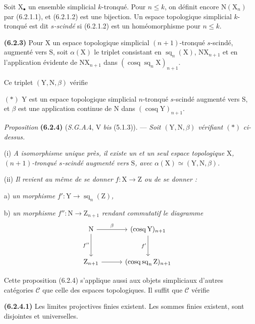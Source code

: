 \documentclass[11pt,leqno]{article}
\newcommand{\Page}[1]{\ifvmode\noindent\else\unskip\ \fi{\footnotesize\textcolor{gray}{[p.\,#1]}}\ \ignorespaces}
\begin{document}
Soit \(\mathrm{X}_{\bullet}\) un ensemble simplicial \(k\)-tronqué. Pour \(n\leq k\), on définit encore \(\mathrm{N}(\mathrm{X}_n)\) par (6.2.1.1), et (6.2.1.2) est une bijection. Un espace topologique simplicial \(k\)-tronqué est dit \textit{\(s\)-scindé} si (6.2.1.2) est un homéomorphisme pour \(n\leq k\).

\textbf{(6.2.3)} Pour \(\mathrm{X}\) un espace topologique simplicial \((n+1)\)-tronqué \(s\)-scindé, augmenté vers \(\mathrm{S}\), soit \(\alpha(\mathrm{X})\) le triplet consistant en \(\operatorname{sq}_n(\mathrm{X})\), \(\mathrm{N}\mathrm{X}_{n+1}\) et en l’application évidente de \(\mathrm{N}\mathrm{X}_{n+1}\) dans \((\operatorname{cosq}\operatorname{sq}_n\mathrm{X})_{n+1}\).

Ce triplet \((\mathrm{Y},\mathrm{N},\beta)\) vérifie

\((\ast)\) \(\mathrm{Y}\) est un espace topologique simplicial \(n\)-tronqué \(s\)-scindé augmenté vers \(\mathrm{S}\), et \(\beta\) est une application continue de \(\mathrm{N}\) dans \((\operatorname{cosq}\mathrm{Y})_{n+1}\).

\textit{Proposition} \textbf{(6.2.4)} (\textit{S.G.A.}4, V \textit{bis} (5.1.3)). — \textit{Soit \((\mathrm{Y},\mathrm{N},\beta)\) vérifiant \((\ast)\) ci-dessus.}

(i) \textit{A isomorphisme unique près, il existe un et un seul espace topologique \(\mathrm{X}\), \((n+1)\)-tronqué \(s\)-scindé augmenté vers \(\mathrm{S}\), avec \(\alpha(\mathrm{X})\simeq(\mathrm{Y},\mathrm{N},\beta)\).}

(ii) \textit{Il revient au même de se donner \(f:\mathrm{X}\to\mathrm{Z}\) ou de se donner :}

a) \textit{un morphisme \(f':\mathrm{Y}\to\operatorname{sq}_n(\mathrm{Z})\),}

b) \textit{un morphisme \(f'':\mathrm{N}\to\mathrm{Z}_{n+1}\) rendant commutatif le diagramme}
\[
\begin{tikzcd}[column sep=3em,row sep=3em]
\mathrm{N}\arrow[r,"\beta"]\arrow[d,"f''"']
  & (\operatorname{cosq}\mathrm{Y})_{n+1}\arrow[d,"f'"']\\
\mathrm{Z}_{n+1}\arrow[r]
  & (\operatorname{cosq}\operatorname{sq}_n\mathrm{Z})_{n+1}
\end{tikzcd}
\]

Cette proposition (6.2.4) s’applique aussi aux objets simpliciaux d’autres catégories \(\mathcal{C}\) que celle des espaces topologiques. Il suffit que \(\mathcal{C}\) vérifie
\Page{20}

\textbf{(6.2.4.1)} Les limites projectives finies existent. Les sommes finies existent, sont disjointes et universelles.
\end{document}
